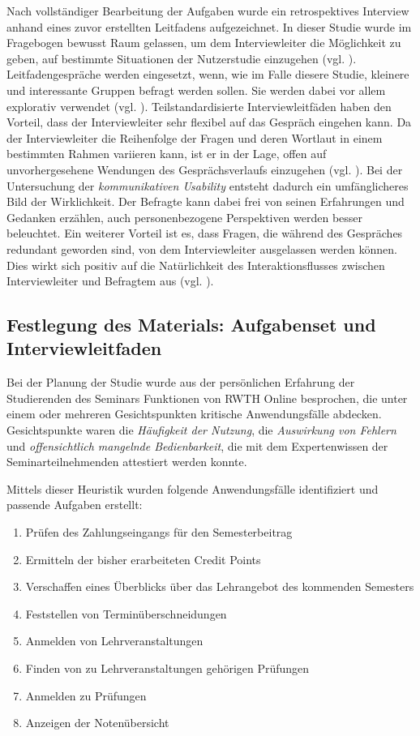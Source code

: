 Nach vollständiger Bearbeitung der Aufgaben wurde ein retrospektives Interview anhand eines zuvor erstellten Leitfadens aufgezeichnet. In dieser Studie wurde im Fragebogen bewusst Raum gelassen, um dem Interviewleiter die Möglichkeit zu geben, auf bestimmte Situationen der Nutzerstudie einzugehen (vgl. \cite[113]{flick1995qualitative}).
Leitfadengespräche werden eingesetzt, wenn, wie im Falle diesere Studie, kleinere und interessante Gruppen befragt werden sollen. Sie werden dabei vor allem explorativ verwendet (vgl. \cite[184]{winfried1999empirische}). Teilstandardisierte Interviewleitfäden haben den Vorteil, dass der Interviewleiter sehr flexibel auf das Gespräch eingehen kann. Da der Interviewleiter die Reihenfolge der Fragen und deren Wortlaut in einem bestimmten Rahmen variieren kann, ist er in der Lage, offen auf unvorhergesehene Wendungen des Gesprächsverlaufs einzugehen (vgl. \cite[113]{flick1995qualitative}). Bei der Untersuchung der \emph{kommunikativen Usability} \textsuperscript{\textregistered} entsteht dadurch ein umfänglicheres Bild der Wirklichkeit. Der Befragte kann dabei frei von seinen Erfahrungen und Gedanken erzählen, auch personenbezogene Perspektiven werden besser beleuchtet. Ein weiterer Vorteil ist es, dass Fragen, die während des Gespräches redundant geworden sind, von dem Interviewleiter ausgelassen werden können. Dies wirkt sich positiv auf die Natürlichkeit des Interaktionsflusses zwischen Interviewleiter und Befragtem aus (vgl. \cite[391]{schnell1999methoden}).

\subsection*{Festlegung des Materials: Aufgabenset und Interviewleitfaden}
Bei der Planung der Studie wurde aus der persönlichen Erfahrung der Studierenden des Seminars Funktionen von RWTH Online besprochen, die unter einem oder mehreren Gesichtspunkten kritische Anwendungsfälle abdecken. Gesichtspunkte waren die \textit{Häufigkeit der Nutzung}, die \textit{Auswirkung von Fehlern} und \textit{offensichtlich mangelnde Bedienbarkeit}, die mit dem Expertenwissen der Seminarteilnehmenden attestiert werden konnte.

Mittels dieser Heuristik wurden folgende Anwendungsfälle identifiziert und passende Aufgaben erstellt:

\begin{enumerate}
    \item Prüfen des Zahlungseingangs für den Semesterbeitrag
    \item Ermitteln der bisher erarbeiteten Credit Points
    \item Verschaffen eines Überblicks über das Lehrangebot des kommenden Semesters
    \item Feststellen von Terminüberschneidungen
    \item Anmelden von Lehrveranstaltungen
    \item Finden von zu Lehrveranstaltungen gehörigen Prüfungen
    \item Anmelden zu Prüfungen
    \item Anzeigen der Notenübersicht
\end{enumerate}


